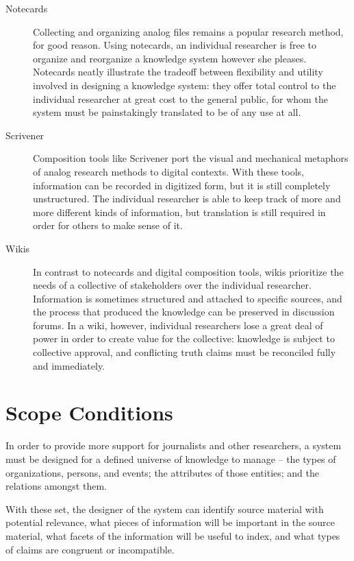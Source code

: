 \documentclass[format=siggraph, review=true]{acmart}
\begin{document}
\begin{description}
  \item [Notecards] Collecting and organizing analog files remains
    a popular research method, for good reason. Using notecards, an
    individual researcher is free to organize and reorganize a
    knowledge system however she pleases. Notecards neatly illustrate
    the tradeoff between flexibility and utility involved in designing
    a knowledge system: they offer total control to the individual
    researcher at great cost to the general public, for whom the system
    must be painstakingly translated to be of any use at all.

  \item [Scrivener] Composition tools like Scrivener port the visual
    and mechanical metaphors of analog research methods to digital
    contexts. With these tools, information can be recorded in digitized
    form, but it is still completely unstructured. The individual
    researcher is able to keep track of more and more different kinds
    of information, but translation is still required in order for others
    to make sense of it.

  \item [Wikis] In contrast to notecards and digital composition tools,
    wikis prioritize the needs of a collective of stakeholders over the
    individual researcher. Information is sometimes structured and
    attached to specific sources, and the process that produced the
    knowledge can be preserved in discussion forums. In a wiki, however,
    individual researchers lose a great deal of power in order to create
    value for the collective: knowledge is subject to collective approval,
    and conflicting truth claims must be reconciled fully and immediately.
\end{description}

\section{Scope Conditions}
In order to provide more support for journalists and other
researchers, a system must be designed for a defined universe of
knowledge to manage -- the types of organizations, persons, and
events; the attributes of those entities; and the relations amongst
them.

With these set, the designer of the system can identify source
material with potential relevance, what pieces of information
will be important in the source material, what facets of the
information will be useful to index, and what types of claims are
congruent or incompatible.
\end{document}
